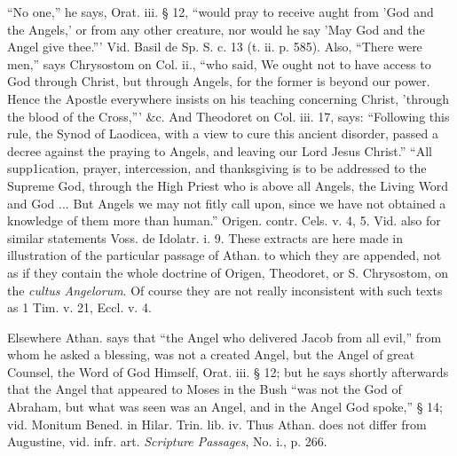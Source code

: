 ``No one,'' he says, Orat. iii. § 12, ``would pray
to receive aught from 'God and the Angels,' or from any other
creature, nor would he say 'May God and the Angel give thee.'''
Vid. Basil de Sp. S. c. 13 (t. ii. p. 585). Also, ``There were men,''
says Chrysostom on Col. ii., ``who said, We ought not to have
access to God through Christ, but through Angels, for the former is
beyond our power. Hence the Apostle everywhere insists on his teaching
concerning Christ, 'through the blood of the Cross,''' \&c. And
Theodoret on Col. iii. 17, says: ``Following this rule, the Synod of
Laodicea, with a view to cure this ancient disorder, passed a decree
against the praying to Angels, and leaving our Lord Jesus Christ.'' ``All
supp1ication, prayer, intercession, and thanksgiving is to be
addressed to the Supreme God, through the High Priest who is above all
Angels, the Living Word and God ... But Angels we may not fitly call
upon, since we have not obtained a knowledge of them more than human.''
Origen. contr. Cels. v. 4, 5. Vid. also for similar statements Voss.
de Idolatr. i. 9. These extracts are here made in illustration of the
particular passage of Athan. to which they are appended, not as if
they contain the whole doctrine of Origen, Theodoret, or S. Chrysostom,
on the \emph{cultus Angelorum}. Of course they are not really
inconsistent with such texts as 1 Tim. v. 21, Eccl. v. 4.

Elsewhere Athan. says that ``the Angel who
delivered Jacob from all evil,'' from whom he asked a blessing, was not
a created Angel, but the Angel of great Counsel, the Word of God
Himself, Orat. iii. § 12; but he says shortly afterwards that the
Angel that appeared to Moses in the Bush ``was not the God of Abraham,
but what was seen was an Angel, and in the Angel God spoke,'' § 14;
vid. Monitum Bened. in Hilar. Trin. lib. iv. Thus Athan. does not
differ from Augustine, vid. infr. art. \emph{Scripture Passages}, No.
i., p. 266.

